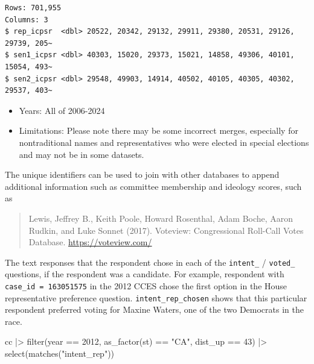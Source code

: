 \documentclass[10pt,article,oneside]{memoir}
\newenvironment{Shaded}{\begin{snugshade}}{\end{snugshade}}
\newcommand{\DecValTok}[1]{\textcolor[rgb]{0.68,0.00,0.00}{#1}}
\newcommand{\FunctionTok}[1]{\textcolor[rgb]{0.28,0.35,0.67}{#1}}
\newcommand{\NormalTok}[1]{\textcolor[rgb]{0.00,0.23,0.31}{#1}}
\newcommand{\SpecialCharTok}[1]{\textcolor[rgb]{0.37,0.37,0.37}{#1}}
\newcommand{\StringTok}[1]{\textcolor[rgb]{0.13,0.47,0.30}{#1}}
\begin{document}
\begin{verbatim}
Rows: 701,955
Columns: 3
$ rep_icpsr  <dbl> 20522, 20342, 29132, 29911, 29380, 20531, 29126, 29739, 205~
$ sen1_icpsr <dbl> 40303, 15020, 29373, 15021, 14858, 49306, 40101, 15054, 493~
$ sen2_icpsr <dbl> 29548, 49903, 14914, 40502, 40105, 40305, 40302, 29537, 403~
\end{verbatim}

\begin{itemize}
\tightlist
\item
  Years: All of 2006-2024
\item
  Limitations: Please note there may be some incorrect merges,
  especially for nontraditional names and representatives who were
  elected in special elections and may not be in some datasets.
\end{itemize}

The unique identifiers can be used to join with other databases to
append additional information such as committee membership and ideology
scores, such as

\begin{quote}
Lewis, Jeffrey B., Keith Poole, Howard Rosenthal, Adam Boche, Aaron
Rudkin, and Luke Sonnet (2017). Voteview: Congressional Roll-Call Votes
Database. \url{https://voteview.com/}
\end{quote}

The text responses that the respondent chose in each of the
\texttt{intent\_} / \texttt{voted\_} questions, if the respondent was a
candidate. For example, respondent with \texttt{case\_id\ =\ 163051575}
in the 2012 CCES chose the first option in the House representative
preference question. \texttt{intent\_rep\_chosen} shows that this
particular respondent preferred voting for Maxine Waters, one of the two
Democrats in the race.

\begin{Shaded}
\begin{Highlighting}[]
\NormalTok{cc }\SpecialCharTok{|\textgreater{}} 
  \FunctionTok{filter}\NormalTok{(year }\SpecialCharTok{==} \DecValTok{2012}\NormalTok{, }\FunctionTok{as\_factor}\NormalTok{(st) }\SpecialCharTok{==} \StringTok{"CA"}\NormalTok{, dist\_up }\SpecialCharTok{==} \DecValTok{43}\NormalTok{) }\SpecialCharTok{|\textgreater{}} 
  \FunctionTok{select}\NormalTok{(}\FunctionTok{matches}\NormalTok{(}\StringTok{"intent\_rep"}\NormalTok{)) }
\end{Highlighting}
\end{Shaded}
\end{document}
